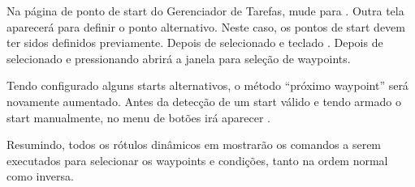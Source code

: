 Na página de ponto de start do Gerenciador de Tarefas, mude para . Outra tela aparecerá para definir o ponto alternativo.  Neste caso, os pontos de start devem ter sidos definidos previamente.  Depois de selecionado  e teclado . Depois de selecionado e pressionando 
 abrirá a janela para seleção de waypoints.
 
Tendo configurado alguns starts alternativos, o método “próximo waypoint” será novamente aumentado.  Antes da detecção de um start válido e tendo armado o start manualmente, no menu de botões irá aparecer  .

Resumindo, todos os rótulos dinâmicos em  mostrarão os comandos a serem executados para selecionar os waypoints e condições, tanto na ordem normal como inversa.

  






